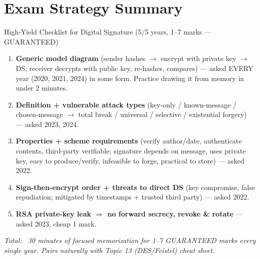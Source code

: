 \documentclass[12pt,a4paper]{article}
\begin{document}
\newpage
\section*{Exam Strategy Summary}

\begin{keybox}{High-Yield Checklist for Digital Signature (5/5 years, 1--7 marks --- GUARANTEED)}
\begin{enumerate}[noitemsep]
  \item \textbf{Generic model diagram} (sender hashes $\to$ encrypt with private key $\to$ DS; receiver decrypts with public key, re-hashes, compares) --- asked EVERY year (2020, 2021, 2024) in some form. Practice drawing it from memory in under 2 minutes.
  \item \textbf{Definition + vulnerable attack types} (key-only / known-message / chosen-message $\to$ total break / universal / selective / existential forgery) --- asked 2023, 2024.
  \item \textbf{Properties + scheme requirements} (verify author/date, authenticate contents, third-party verifiable; signature depends on message, uses private key, easy to produce/verify, infeasible to forge, practical to store) --- asked 2022.
  \item \textbf{Sign-then-encrypt order + threats to direct DS} (key compromise, false repudiation; mitigated by timestamps + trusted third party) --- asked 2022.
  \item \textbf{RSA private-key leak $\Rightarrow$ no forward secrecy, revoke \& rotate} --- asked 2023, cheap 1 mark.
\end{enumerate}
\textit{Total: ~30 minutes of focused memorization for 1--7 GUARANTEED marks every single year. Pairs naturally with Topic 13 (DES/Feistel) cheat sheet.}
\end{keybox}
\end{document}
